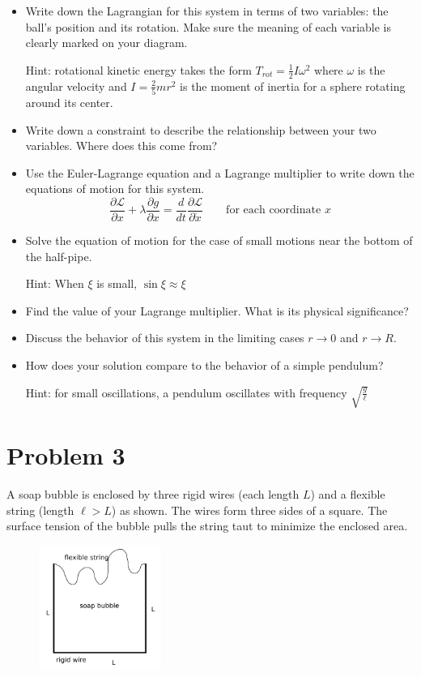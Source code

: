 \documentclass{article}
\begin{document}
\begin{itemize}
    \item Write down the Lagrangian for this system in terms of two variables: the ball's position and its rotation. Make sure the meaning of each variable is clearly marked on your diagram.
    
    Hint: rotational kinetic energy takes the form $T_{rot} = \tfrac{1}{2} I \omega^2$ where $\omega$ is the angular velocity and $I = \tfrac{2}{5} m r^2$ is the moment of inertia for a sphere rotating around its center.
    \item Write down a constraint to describe the relationship between your two variables. Where does this come from?
    \item Use the Euler-Lagrange equation and a Lagrange multiplier to write down the equations of motion for this system. 
    $$
    \frac{\partial \mathcal{L}}{\partial x} + \lambda \frac{\partial g}{\partial x} = \frac{d}{dt} \frac{\partial \mathcal{L}}{\partial \dot{x}}
    \quad\quad\text{for each coordinate $x$}
    $$
    \item Solve the equation of motion for the case of small motions near the bottom of the half-pipe.

    Hint: When $\xi$ is small, $\sin\xi \approx \xi$
    \item Find the value of your Lagrange multiplier. What is its physical significance?
    \item Discuss the behavior of this system in the limiting cases $r \rightarrow 0$ and $r \rightarrow R$.
    \item How does your solution compare to the behavior of a simple pendulum?
    
    Hint: for small oscillations, a pendulum oscillates with frequency $\sqrt{\frac{g}{\ell}}$
\end{itemize}

\newpage

\section*{Problem 3}

A soap bubble is enclosed by three rigid wires (each length $L$) and a flexible string (length $\ell > L$) as shown. The wires form three sides of a square. The surface tension of the bubble pulls the string taut to minimize the enclosed area.

\begin{figure}[h]
\includegraphics[width=4cm]{string-bubble.png}
\centering
\end{figure}
\end{document}
